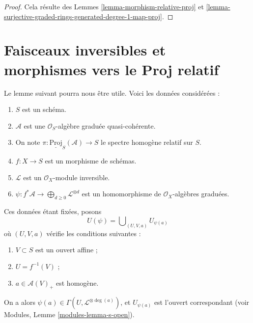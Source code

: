 \begin{proof}
Cela résulte des Lemmes \ref{lemma-morphism-relative-proj} et
\ref{lemma-surjective-graded-rings-generated-degree-1-map-proj}.
\end{proof}


\section{Faisceaux inversibles et morphismes vers le Proj relatif}
\label{section-invertible-relative-proj}

\noindent
Le lemme suivant pourra nous être utile. Voici les données considérées :
\begin{enumerate}
\item $S$ est un schéma.
\item $\mathcal{A}$ est une $\mathcal{O}_S$-algèbre graduée quasi-cohérente.
\item On note $\pi : \underline{\text{Proj}}_S(\mathcal{A}) \to S$ le spectre
homogène relatif sur $S$.
\item $f : X \to S$ est un morphisme de schémas.
\item $\mathcal{L}$ est un $\mathcal{O}_X$-module inversible.
\item $\psi : f^*\mathcal{A} \to
\bigoplus_{d \geq 0} \mathcal{L}^{\otimes d}$ est un homomorphisme de
$\mathcal{O}_X$-algèbres graduées.
\end{enumerate}
Ces données étant fixées, posons
$$
U(\psi) = \bigcup\nolimits_{(U, V, a)} U_{\psi(a)}
$$
où $(U, V, a)$ vérifie les conditions suivantes :
\begin{enumerate}
\item $V \subset S$ est un ouvert affine ;
\item $U = f^{-1}(V)$ ;
\item $a \in \mathcal{A}(V)_{+}$ est homogène.
\end{enumerate}
On a alors $\psi(a) \in \Gamma(U, \mathcal{L}^{\otimes \deg(a)})$, et
$U_{\psi(a)}$ est l'ouvert correspondant (voir Modules,
Lemme \ref{modules-lemma-s-open}).

